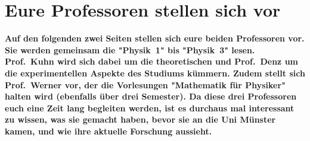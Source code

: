 \section[Eure Profs stellen sich vor]{Eure Professoren stellen sich vor}
\textbf{Auf den folgenden zwei Seiten stellen sich eure beiden Professoren vor.
    Sie werden gemeinsam die "Physik~1" bis "Physik~3" lesen.
    Prof.\ Kuhn wird sich dabei um die theoretischen und Prof.\ Denz um die experimentellen Aspekte des Studiums kümmern.
    Zudem stellt sich Prof.\ Werner vor, der die Vorlesungen "Mathematik für Physiker" halten wird (ebenfalls über drei Semester).
	Da diese drei Professoren euch eine Zeit lang begleiten werden, ist es durchaus mal interessant zu wissen, was sie gemacht haben, bevor sie an die Uni Münster kamen, und wie ihre aktuelle Forschung aussieht.}

